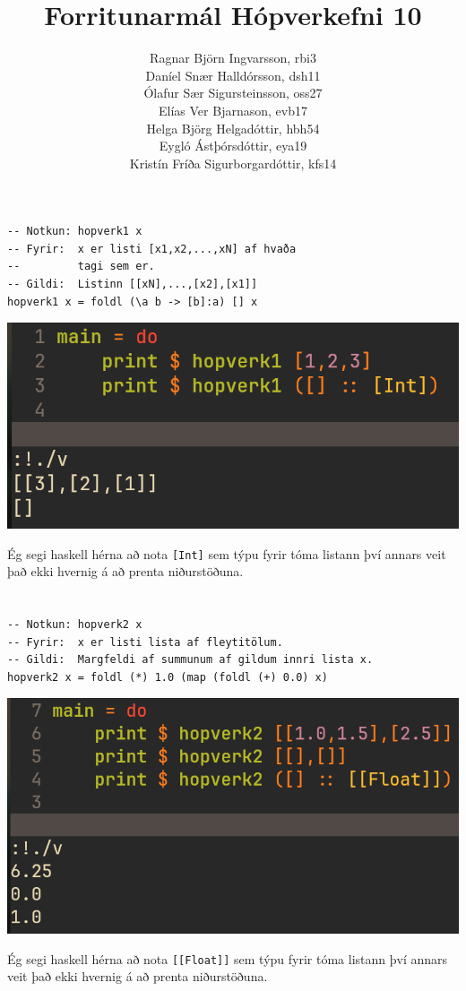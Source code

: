 \documentclass{article}
\title{Forritunarmál Hópverkefni 10}
\author{Ragnar Björn Ingvarsson, rbi3 \\
		Daníel Snær Halldórsson, dsh11 \\
		Ólafur Sær Sigursteinsson, oss27 \\
	    Elías Ver Bjarnason, evb17 \\
		Helga Björg Helgadóttir, hbh54 \\
	    Eygló Ástþórsdóttir, eya19 \\
	    Kristín Fríða Sigurborgardóttir, kfs14}
\begin{document}
\renewcommand\thepage{}

	\maketitle

	\newpage
	\setcounter{page}{1}
	\renewcommand\thepage{\arabic{page}}

	\section{}
	\begin{verbatim}
-- Notkun: hopverk1 x
-- Fyrir:  x er listi [x1,x2,...,xN] af hvaða
--         tagi sem er.
-- Gildi:  Listinn [[xN],...,[x2],[x1]]
hopverk1 x = foldl (\a b -> [b]:a) [] x
    \end{verbatim}
	\vspace{.5em}
	\begin{center}
		\includegraphics[scale=.35]{h1.png}
	\end{center}
	Ég segi haskell hérna að nota \texttt{[Int]} sem týpu fyrir 
	tóma listann því annars veit það ekki hvernig á að prenta niðurstöðuna.
	
	\section{}
	\begin{verbatim}
-- Notkun: hopverk2 x
-- Fyrir:  x er listi lista af fleytitölum.
-- Gildi:  Margfeldi af summunum af gildum innri lista x.
hopverk2 x = foldl (*) 1.0 (map (foldl (+) 0.0) x)
    \end{verbatim}
	\vspace{.5em}
	\begin{center}
		\includegraphics[scale=.35]{h2.png}
	\end{center}

	Ég segi haskell hérna að nota \texttt{[[Float]]} sem týpu fyrir 
	tóma listann því annars veit það ekki hvernig á að prenta niðurstöðuna.
\end{document}

